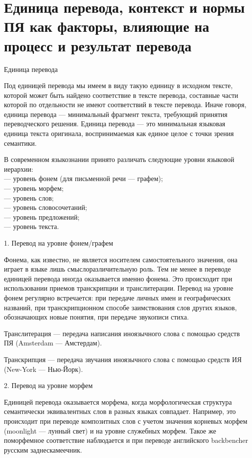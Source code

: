\section{Единица перевода, контекст и нормы ПЯ как факторы, влияющие на процесс и результат перевода}

Единица перевода

Под единицей перевода мы имеем в виду такую единицу в исходном тексте, которой может быть найдено соответствие в тексте перевода, составные части которой по отдельности не имеют соответствий в тексте перевода. Иначе говоря, единица перевода --- минимальный фрагмент текста, требующий принятия переводческого решения. Единица перевода --- это минимальная языковая единица текста оригинала, воспринимаемая как единое целое с точки зрения семантики.

В современном языкознании принято различать следующие уровни языковой иерархии:
\\
---   уровень фонем (для письменной речи --- графем);
\\
---   уровень морфем;
\\
---   уровень слов;
\\
---   уровень словосочетаний;
\\
---   уровень предложений;
\\
---   уровень текста.

1. Перевод на уровне фонем/графем

Фонема, как известно, не является носителем самостоятельного значения, она играет в языке лишь смыслоразличительную роль. Тем не менее в переводе единицей перевода иногда оказывается именно фонема. Это происходит при использовании приемов транскрипции и транслитерации. Перевод на уровне фонем регулярно встречается: при передаче личных имен и географических названий, при транскрипционном способе заимствования слов других языков, обозначающих новые понятия, при передаче звукописи стиха. 

Транслитерация --- передача написания иноязычного слова с помощью средств ПЯ (Amsterdam --- Амстердам).

Транскрипция --- передача звучания иноязычного слова с помощью средств ИЯ (New-York --- Нью-Йорк).

2. Перевод на уровне морфем

Единицей перевода оказывается морфема, когда морфологическая структура семантически эквивалентных слов в разных языках совпадает. Например, это происходит при переводе композитных слов с учетом значения корневых морфем (moonlight --- лунный свет) и на уровне служебных морфем. Такое же поморфемное соответствие наблюдается и при переводе английского backbencher русским заднескамеечник.

